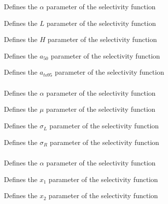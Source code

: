  {Defines the $\alpha$ parameter of the selectivity function}

 {Defines the $L$ parameter of the selectivity function}

 {Defines the $H$ parameter of the selectivity function}

 {Defines the $a_{50}$ parameter of the selectivity function}

 {Defines the $a_{to95}$ parameter of the selectivity function}

\subsubsection[Double-normal]{}

 {Defines the $\alpha$ parameter of the selectivity function}

 {Defines the $\mu$ parameter of the selectivity function}

 {Defines the $\sigma_L$ parameter of the selectivity function}

 {Defines the $\sigma_R$ parameter of the selectivity function}

\subsubsection[Double-exponential]{}

 {Defines the $\alpha$ parameter of the selectivity function}

 {Defines the $x_1$ parameter of the selectivity function}

 {Defines the $x_2$ parameter of the selectivity function}

